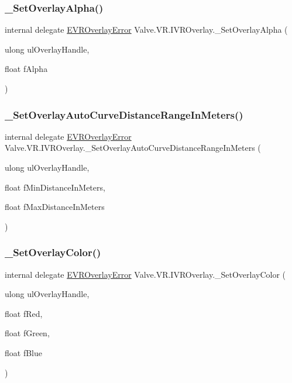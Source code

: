 \subsubsection{\texorpdfstring{\_SetOverlayAlpha()}{\_SetOverlayAlpha()}}
{\footnotesize\ttfamily internal delegate \mbox{\hyperlink{namespace_valve_1_1_v_r_aaee5c5144f42b7969d45b854f51b0c18}{E\+V\+R\+Overlay\+Error}} Valve.\+V\+R.\+I\+V\+R\+Overlay.\+\_\+\+Set\+Overlay\+Alpha (\begin{DoxyParamCaption}\item[{ulong}]{ul\+Overlay\+Handle,  }\item[{float}]{f\+Alpha }\end{DoxyParamCaption})}

\mbox{\label{struct_valve_1_1_v_r_1_1_i_v_r_overlay_a14c24c561079ac045d2e9fd58b896add}} 
\subsubsection{\texorpdfstring{\_SetOverlayAutoCurveDistanceRangeInMeters()}{\_SetOverlayAutoCurveDistanceRangeInMeters()}}
{\footnotesize\ttfamily internal delegate \mbox{\hyperlink{namespace_valve_1_1_v_r_aaee5c5144f42b7969d45b854f51b0c18}{E\+V\+R\+Overlay\+Error}} Valve.\+V\+R.\+I\+V\+R\+Overlay.\+\_\+\+Set\+Overlay\+Auto\+Curve\+Distance\+Range\+In\+Meters (\begin{DoxyParamCaption}\item[{ulong}]{ul\+Overlay\+Handle,  }\item[{float}]{f\+Min\+Distance\+In\+Meters,  }\item[{float}]{f\+Max\+Distance\+In\+Meters }\end{DoxyParamCaption})}

\mbox{\label{struct_valve_1_1_v_r_1_1_i_v_r_overlay_ae4f9f357c73e29c9b4e88c6f8070df8e}} 
\subsubsection{\texorpdfstring{\_SetOverlayColor()}{\_SetOverlayColor()}}
{\footnotesize\ttfamily internal delegate \mbox{\hyperlink{namespace_valve_1_1_v_r_aaee5c5144f42b7969d45b854f51b0c18}{E\+V\+R\+Overlay\+Error}} Valve.\+V\+R.\+I\+V\+R\+Overlay.\+\_\+\+Set\+Overlay\+Color (\begin{DoxyParamCaption}\item[{ulong}]{ul\+Overlay\+Handle,  }\item[{float}]{f\+Red,  }\item[{float}]{f\+Green,  }\item[{float}]{f\+Blue }\end{DoxyParamCaption})}


